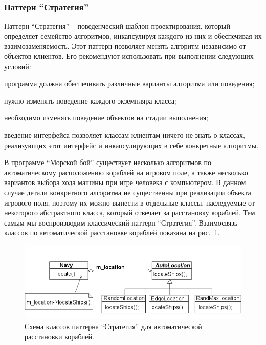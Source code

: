 \documentclass[12pt, a4paper, oneside]{article}
\begin{document}
\subsubsection{Паттерн ``Стратегия''}

Паттерн ``Стратегия'' -- поведенческий шаблон проектирования, который определяет семейство алгоритмов, инкапсулируя каждого из них и обеспечивая их взаимозаменяемость. Этот паттерн позволяет менять алгоритм независимо от объектов-клиентов. Его рекомендуют использовать при выполнении следующих условий:

\begin{itemize*}
	\item программа должна обеспечивать различные варианты алгоритма или поведения;
       \item нужно изменять поведение каждого экземпляра класса;
       \item необходимо изменять поведение объектов на стадии выполнения;
       \item введение интерфейса позволяет классам-клиентам ничего не знать о классах, реализующих этот интерфейс и инкапсулирующих в себе конкретные алгоритмы.
\end{itemize*}

В программе ``Морской бой'' существует несколько алгоритмов по автоматическому расположению кораблей на игровом поле, а также несколько вариантов выбора хода машины при игре человека с компьютером. В данном случае детали конкретного алгоритма не существенны при реализации объекта игрового поля, поэтому их можно вынести в отдельные классы, наследуемые от некоторого абстрактного класса, который отвечает за расстановку кораблей. Тем самым мы воспроизводим классический паттерн ``Стратегия''. Взаимосвязь классов по автоматической расстановке кораблей показана на рис.~\ref{fig:location}. 


\begin{figure}[t]
\begin{center}
	\includegraphics[scale=0.7]{locations.png}
	\caption{Схема классов паттерна ``Стратегия'' для автоматической расстановки кораблей.}
	\label{fig:location}
	\vspace{-0.5cm}
\end{center}
\end{figure}
\end{document}
